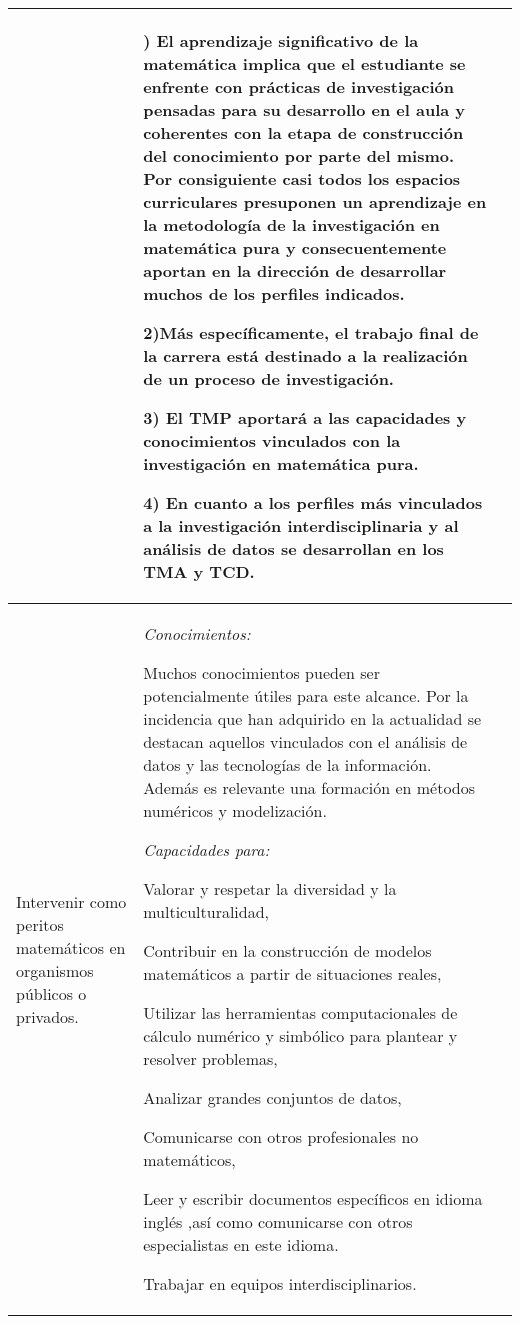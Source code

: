 \documentclass[a4paper, 12pt]{article}
\begin{document}
\begin{center}
\begin{xltabular}{1.0\textwidth}{|>{\raggedright\arraybackslash}X |
>{\raggedright\arraybackslash}X |
>{\raggedright\arraybackslash}X |
}
  
  
  &  1) El aprendizaje significativo de la matemática implica que el estudiante se enfrente con prácticas de investigación pensadas para su desarrollo en el aula y coherentes con  la etapa de construcción del conocimiento por parte del mismo. Por consiguiente casi todos los espacios curriculares presuponen un aprendizaje en la metodología de la investigación en matemática pura y consecuentemente aportan en la dirección de desarrollar muchos de los perfiles indicados.
  
  2)Más específicamente, el trabajo final de la carrera está destinado a la realización de un proceso de investigación.
  
  3) El TMP aportará a las capacidades y conocimientos vinculados con la investigación en matemática pura. 
  
 
  4) En cuanto a los perfiles más vinculados a la investigación interdisciplinaria y al análisis de datos se desarrollan en los TMA y TCD. \\ \hline

 
 Intervenir como peritos matemáticos en organismos públicos o privados.
 

  &   
   \emph{Conocimientos:}
   
   Muchos conocimientos pueden ser potencialmente útiles para este alcance. Por la incidencia que han adquirido en la actualidad se destacan aquellos vinculados con el análisis de datos y las tecnologías de la información.  Además es relevante una formación en métodos numéricos y modelización.
   
   
   \emph{Capacidades para:}


 Valorar y respetar la diversidad y la multiculturalidad,

Contribuir en la construcción de modelos matemáticos a partir de
situaciones reales,

 Utilizar las herramientas computacionales de cálculo numérico y simbólico para plantear y resolver problemas,
 
 Analizar grandes conjuntos de datos,

 Comunicarse con otros profesionales no matemáticos,

  Leer y escribir  documentos específicos en idioma inglés ,así como comunicarse con otros especialistas en este idioma.
  
  Trabajar en equipos interdisciplinarios.

  

  
  

\end{xltabular}
\end{center}
\end{document}
